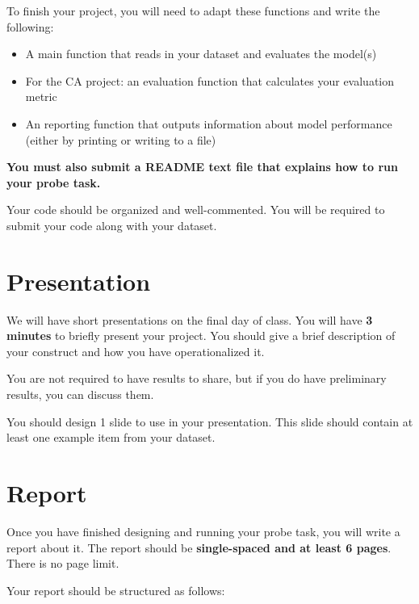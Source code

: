 \documentclass[12pt,table]{article}
\begin{document}
To finish your project, you will need to adapt these functions and write the following:

\begin{itemize}
\item A main function that reads in your dataset and evaluates the model(s)
\item For the CA project: an evaluation function that calculates your evaluation metric
\item An reporting function that outputs information about model performance (either by printing or writing to a file)
\end{itemize}

\textbf{You must also submit a README text file that explains how to run your probe task.}

Your code should be organized and well-commented. You will be required to submit your code along with your dataset.

\section{Presentation}

We will have short presentations on the final day of class. You will have \textbf{3 minutes} to briefly present your project. You should give a brief description of your construct and how you have operationalized it. 

You are not required to have results to share, but if you do have preliminary results, you can discuss them.

You should design 1 slide to use in your presentation. This slide should contain at least one example item from your dataset.

\section{Report}

Once you have finished designing and running your probe task, you will write a report about it. The report should be \textbf{single-spaced and at least 6 pages}. There is no page limit.

Your report should be structured as follows:
\end{document}
